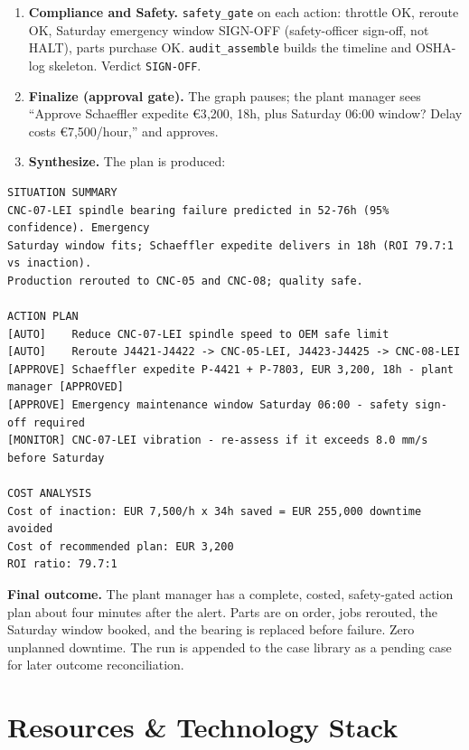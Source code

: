 \documentclass[11pt,a4paper]{article}
\let\oldsection\section
\renewcommand{\section}{\needspace{7\baselineskip}\oldsection}
\newenvironment{codeblock}{\par\medskip\needspace{4\baselineskip}\noindent\begin{minipage}{\linewidth}}
  {\end{minipage}\par\medskip}
\newcommand{\tool}[1]{\texttt{#1}}
\begin{document}
\begin{enumerate}
  \item \textbf{Compliance and Safety.} \tool{safety\_gate} on each action: throttle OK, reroute OK, Saturday emergency window SIGN-OFF (safety-officer sign-off, not HALT), parts purchase OK. \tool{audit\_assemble} builds the timeline and OSHA-log skeleton. Verdict \texttt{SIGN-OFF}.
  \item \textbf{Finalize (approval gate).} The graph pauses; the plant manager sees ``Approve Schaeffler expedite \euro{}3{,}200, 18h, plus Saturday 06:00 window? Delay costs \euro{}7{,}500/hour,'' and approves.
  \item \textbf{Synthesize.} The plan is produced:
\end{enumerate}

\begin{codeblock}
\begin{lstlisting}
SITUATION SUMMARY
CNC-07-LEI spindle bearing failure predicted in 52-76h (95% confidence). Emergency
Saturday window fits; Schaeffler expedite delivers in 18h (ROI 79.7:1 vs inaction).
Production rerouted to CNC-05 and CNC-08; quality safe.

ACTION PLAN
[AUTO]    Reduce CNC-07-LEI spindle speed to OEM safe limit
[AUTO]    Reroute J4421-J4422 -> CNC-05-LEI, J4423-J4425 -> CNC-08-LEI
[APPROVE] Schaeffler expedite P-4421 + P-7803, EUR 3,200, 18h - plant manager [APPROVED]
[APPROVE] Emergency maintenance window Saturday 06:00 - safety sign-off required
[MONITOR] CNC-07-LEI vibration - re-assess if it exceeds 8.0 mm/s before Saturday

COST ANALYSIS
Cost of inaction: EUR 7,500/h x 34h saved = EUR 255,000 downtime avoided
Cost of recommended plan: EUR 3,200
ROI ratio: 79.7:1
\end{lstlisting}
\end{codeblock}

\textbf{Final outcome.} The plant manager has a complete, costed, safety-gated action plan about four minutes after the alert. Parts are on order, jobs rerouted, the Saturday window booked, and the bearing is replaced before failure. Zero unplanned downtime. The run is appended to the case library as a pending case for later outcome reconciliation.

\section{Resources \& Technology Stack}
\end{document}
